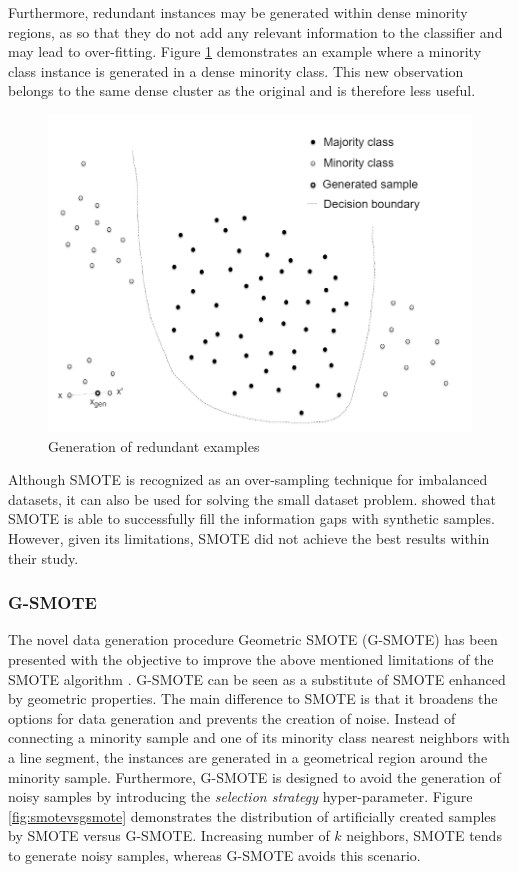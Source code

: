 \documentclass[parskip=full]{scrartcl}
\begin{document}
Furthermore, redundant instances may be generated within dense minority regions,
as so that they do not add any relevant information to the classifier and may
lead to over-fitting. Figure \ref{fig:redundant-examples} demonstrates an
example where a minority  class instance is generated in a dense minority class.
This new observation belongs to the same dense cluster as the original and is
therefore less useful. 

\begin{figure}[H]
	\centering
	\includegraphics[width=0.6\linewidth]{../analysis/redundant_examples.png}
	\caption{Generation of redundant examples \cite{Douzas.2019}}
	\label{fig:redundant-examples}
\end{figure}

Although SMOTE is recognized as an over-sampling technique for imbalanced
datasets, it can also be used for solving the small dataset problem.
\cite{Li.2018} showed that SMOTE is able to successfully fill the information
gaps with synthetic samples. However, given its limitations, SMOTE did not
achieve the best results within their study.

\subsubsection{G-SMOTE}

The novel data generation procedure Geometric SMOTE (G-SMOTE) has been presented
with the objective to improve the above mentioned limitations of the SMOTE
algorithm \cite{Douzas.2019}. G-SMOTE can be seen as a substitute of SMOTE
enhanced by geometric properties. The main difference to SMOTE is that it
broadens the options for data generation and prevents the creation of noise.
Instead of connecting a minority sample and one of its minority class nearest
neighbors with a line segment, the instances are generated in a geometrical
region around the minority sample. Furthermore, G-SMOTE is designed to avoid the
generation of noisy samples by introducing the \textit{selection strategy}
hyper-parameter. Figure \ref{fig:smotevsgsmote} demonstrates the distribution of
artificially created samples by SMOTE versus G-SMOTE. Increasing number of
$\mathit{k}$ neighbors, SMOTE tends to generate noisy samples, whereas G-SMOTE
avoids this scenario.
\end{document}
